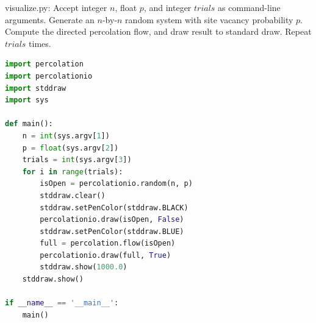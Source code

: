 \documentclass[8pt,a4paper,compress]{beamer}
\begin{document}
\begin{frame}[fragile]
\pause

\begin{framed}
\tiny visualize.py: Accept integer $n$, float $p$, and integer $trials$ as command-line arguments. Generate an $n$-by-$n$ random system with site vacancy probability $p$. Compute the directed percolation flow, and draw result to standard draw. Repeat $trials$ times.
\end{framed}

\begin{lstlisting}[language=Python]
import percolation
import percolationio
import stddraw
import sys

def main():
    n = int(sys.argv[1])
    p = float(sys.argv[2])
    trials = int(sys.argv[3])
    for i in range(trials):
        isOpen = percolationio.random(n, p)
        stddraw.clear()
        stddraw.setPenColor(stddraw.BLACK)
        percolationio.draw(isOpen, False)
        stddraw.setPenColor(stddraw.BLUE)
        full = percolation.flow(isOpen)
        percolationio.draw(full, True)
        stddraw.show(1000.0)
    stddraw.show()

if __name__ == '__main__':
    main()
\end{lstlisting}
\end{frame}
\end{document}
